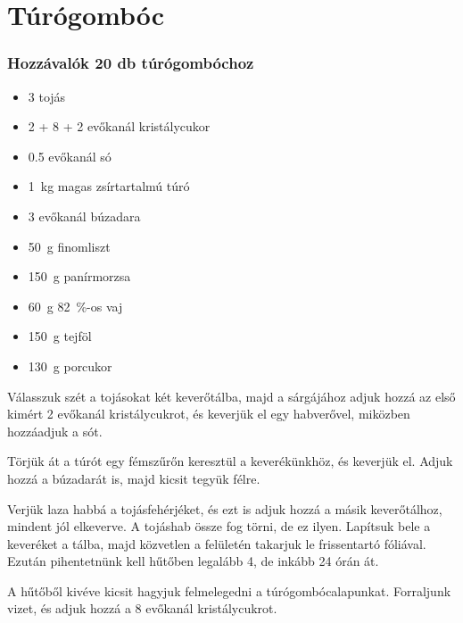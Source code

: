 \newpage
\section*{Túrógombóc} \label{sec:turogomboc}

\subsubsection*{Hozzávalók 20 db túrógombóchoz}
\begin{itemize}
    \item \num{3} tojás
    \item \num{2} + \num{8} + \num{2} evőkanál kristálycukor
    \item \num{0.5} evőkanál só
    \item \qty{1}{\kg} magas zsírtartalmú túró
    \item \num{3} evőkanál búzadara
    \item \qty{50}{\g} finomliszt
    \item \qty{150}{\g} panírmorzsa
    \item \qty{60}{\g} \qty{82}{\percent}-os vaj
    \item \qty{150}{\g} tejföl
    \item \qty{130}{\g} porcukor
\end{itemize}

Válasszuk szét a tojásokat két keverőtálba, majd a sárgájához adjuk hozzá az első kimért \num{2} evőkanál kristálycukrot, és keverjük el egy habverővel, miközben hozzáadjuk a sót.

Törjük át a túrót egy fémszűrőn keresztül a keverékünkhöz, és keverjük el. Adjuk hozzá a búzadarát is, majd kicsit tegyük félre.

Verjük laza habbá a tojásfehérjéket, és ezt is adjuk hozzá a másik keverőtálhoz, mindent jól elkeverve. A tojáshab össze fog törni, de ez ilyen. Lapítsuk bele a keveréket a tálba, majd közvetlen a felületén takarjuk le frissentartó fóliával. Ezután pihentetnünk kell hűtőben legalább \num{4}, de inkább \num{24} órán át.

A hűtőből kivéve kicsit hagyjuk felmelegedni a túrógombócalapunkat. Forraljunk vizet, és adjuk hozzá a \num{8} evőkanál kristálycukrot.
